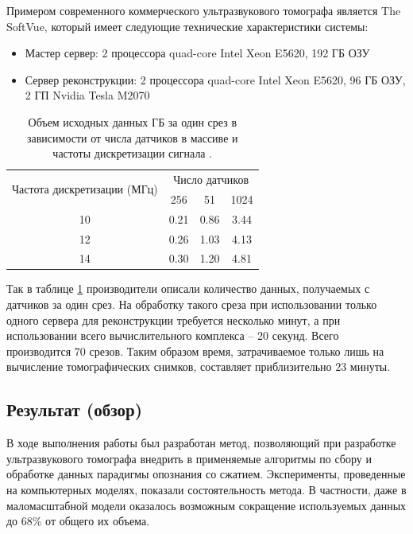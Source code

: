 \documentclass[14pt]{matmex-diploma}
\begin{document}
Примером современного коммерческого ультразвукового томографа является The SoftVue\cite{roy2013breast}, который имеет следующие технические характеристики системы:
\begin{itemize}
\item Мастер сервер: 2 процессора quad-core Intel Xeon E5620, 192 ГБ ОЗУ
\item Сервер реконструкции: 2 процессора quad-core Intel Xeon E5620, 96 ГБ ОЗУ, 2 ГП Nvidia Tesla M2070
\end{itemize}

\begin{table}[h]
\centering
\begin{tabular}{ c | c | c | c }
    \hline
    \multirow{2}{*}{Частота дискретизации (МГц)} & \multicolumn{3}{c}{Число датчиков}  \\ \cline{2-4}
    & 256 & 51 & 1024 \\

    \hline
    10 & 0.21 & 0.86 & 3.44 \\
    12 & 0.26 & 1.03 & 4.13 \\
    14 & 0.30 & 1.20 & 4.81 \\
    \hline
\end{tabular}
\caption{\small Объем исходных данных ГБ за один срез в зависимости от числа датчиков в массиве и частоты дискретизации сигнала \cite{roy2013breast}.}
\label{table:datasize_ex}
\end{table}
Так в таблице \ref{table:datasize_ex} производители описали количество данных, получаемых с датчиков за один срез. На обработку такого среза при использовании только одного сервера для реконструкции требуется несколько минут, а при использовании всего вычислительного комплекса -- 20 секунд. Всего производится 70 срезов\cite{roy2013breast}. Таким образом время, затрачиваемое только лишь на вычисление томографических снимков, составляет приблизительно $23$ минуты.

\subsection{Результат (обзор)}

В ходе выполнения работы был разработан метод, позволяющий при разработке ультразвукового томографа внедрить в применяемые алгоритмы по сбору и обработке данных парадигмы опознания со сжатием. Эксперименты, проведенные на компьютерных моделях, показали состоятельность метода. В частности, даже в маломасштабной модели оказалось возможным сокращение используемых данных до 68\% от общего их объема.
\end{document}
